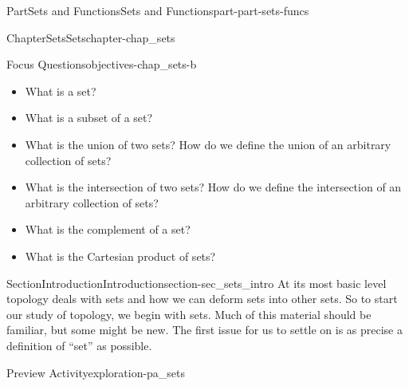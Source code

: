 \documentclass[oneside,10pt,]{book}
\numberwithin{equation}{chapter}
\begin{document}
\setcounter{tocdepth}{0}
\renewcommand*\contentsname{Contents}
\tableofcontents
\mainmatter
%
%
\typeout{************************************************}
\typeout{************************************************}
%
\begin{partptx}{Part}{Sets and Functions}{}{Sets and Functions}{}{}{part-part-sets-funcs}
\renewcommand*{\partname}{Part}
%
\typeout{************************************************}
\typeout{************************************************}
%
\begin{chapterptx}{Chapter}{Sets}{}{Sets}{}{}{chapter-chap_sets}
\renewcommand*{\chaptername}{Chapter}
\begin{objectives}{Focus Questions}{objectives-chap_sets-b}
%
\begin{itemize}[label=\textbullet]
\item{}What is a set?%
\item{}What is a subset of a set?%
\item{}What is the union of two sets? How do we define the union of an arbitrary collection of sets?%
\item{}What is the intersection of two sets? How do we define the intersection of an arbitrary collection of sets?%
\item{}What is the complement of a set?%
\item{}What is the Cartesian product of sets?%
\end{itemize}
\end{objectives}
%
%
\typeout{************************************************}
\typeout{************************************************}
%
\begin{sectionptx}{Section}{Introduction}{}{Introduction}{}{}{section-sec_sets_intro}
At its most basic level topology deals with sets and how we can deform sets into other sets. So to start our study of topology, we begin with sets. Much of this material should be familiar, but some might be new. The first issue for us to settle on is as precise a definition of ``set'' as possible.%
\begin{exploration}{Preview Activity}{}{exploration-pa_sets}%

\end{exploration}
\end{sectionptx}
\end{chapterptx}
\end{partptx}
\end{document}
